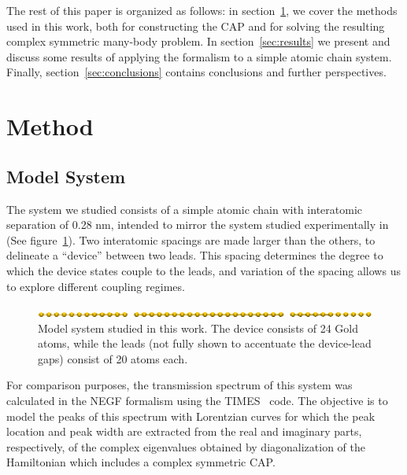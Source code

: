 The rest of this paper is organized as follows: in section~\ref{sec:method}, we
cover the methods used in this work, both for constructing the \ac{CAP} and for
solving the resulting complex symmetric many-body problem. In
section~\ref{sec:results} we present and discuss some results of applying the
formalism to a simple atomic chain system. Finally,
section~\ref{sec:conclusions} contains conclusions and further perspectives.


\section{Method}
\label{sec:method}

\subsection{Model System}
\label{subsec:modelsystem}

The system we studied consists of a simple atomic chain with interatomic
separation of 0.28 nm, intended to mirror the system studied experimentally
in~\cite{nilius2002science} (See figure~\ref{fig:chaincapdevice}). Two interatomic
spacings are made larger than the others, to delineate a ``device'' between two
leads. This spacing determines the degree to which the device states couple to
the leads, and variation of the spacing allows us to explore different coupling
regimes.

\begin{figure}
	\begin{center}
		\includegraphics[width=0.9\linewidth]{figures/chaincapdevice}
	\end{center}
	\caption{Model system studied in this work. The device consists of 24
	Gold atoms, while the leads (not fully shown to accentuate the
	device-lead gaps) consist of 20 atoms each.}
	\label{fig:chaincapdevice}
\end{figure}

For comparison purposes, the transmission spectrum of this system was
calculated in the \ac{NEGF} formalism using the TIMES~\cite{times} code. The
objective is to model the peaks of this spectrum with Lorentzian curves for
which the peak location and peak width are extracted from the real and
imaginary parts, respectively, of the complex eigenvalues obtained by
diagonalization of the Hamiltonian which includes a complex symmetric \ac{CAP}.

